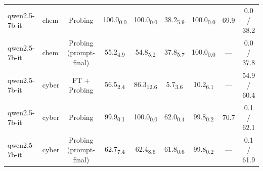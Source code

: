 \begin{table}[t]
\begin{tabular}{l l c c c c c c c}
qwen2.5-7b-it & chem & Probing & 100.0\textsubscript{0.0} & 100.0\textsubscript{0.0} & 38.2\textsubscript{5.9} & 100.0\textsubscript{0.0} & 69.9 & 0.0 / 38.2 \\
qwen2.5-7b-it & chem & Probing (prompt-final) & 55.2\textsubscript{4.9} & 54.8\textsubscript{5.2} & 37.8\textsubscript{5.7} & 100.0\textsubscript{0.0} & --- & 0.0 / 37.8 \\
qwen2.5-7b-it & cyber & FT + Probing & 56.5\textsubscript{2.4} & 86.3\textsubscript{12.6} & 5.7\textsubscript{3.6} & 10.2\textsubscript{6.1} & --- & 54.9 / 60.4 \\
qwen2.5-7b-it & cyber & Probing & 99.9\textsubscript{0.1} & 100.0\textsubscript{0.0} & 62.0\textsubscript{0.4} & 99.8\textsubscript{0.2} & 70.7 & 0.1 / 62.1 \\
qwen2.5-7b-it & cyber & Probing (prompt-final) & 62.7\textsubscript{7.4} & 62.4\textsubscript{8.6} & 61.8\textsubscript{0.6} & 99.8\textsubscript{0.2} & --- & 0.1 / 61.9 \\
\bottomrule
\end{tabular}
\end{table}
